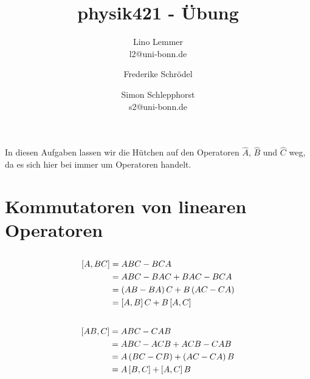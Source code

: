 


\setcounter{thezettel}{6}
\renewcommand\thesection{\arabic{thezettel}.\arabic{section}}

\newcommand\ccancel[2][black]{\renewcommand\CancelColor{\color{#1}}\cancel{#2}}


\title{physik421 - Übung }
\author{Lino Lemmer \\ \small{l2@uni-bonn.de} \and Frederike Schrödel \and Simon Schlepphorst\\ \small{s2@uni-bonn.de}}


\maketitle

In diesen Aufgaben lassen wir die Hütchen auf den Operatoren $\hat A$, $\hat B$
und $\hat C$ weg, da es sich hier bei immer um Operatoren handelt.

\section{Kommutatoren von linearen Operatoren}

\subsection{}

\begin{align*}
    \sbr{A,BC} &= ABC - BCA \\
               &= ABC - BAC + BAC -BCA \\
               &= \del{AB - BA}C + B\del{AC - CA} \\
               &= \sbr{A,B}C + B\sbr{A,C}
\end{align*}

\subsection{}

\begin{align*}
    \sbr{AB,C} &= ABC - CAB \\
               &= ABC - ACB + ACB - CAB \\
               &= A\del{BC-CB} + \del{AC-CA}B \\
               &= A\sbr{B,C} + \sbr{A,C}B
\end{align*}

\subsection{}

